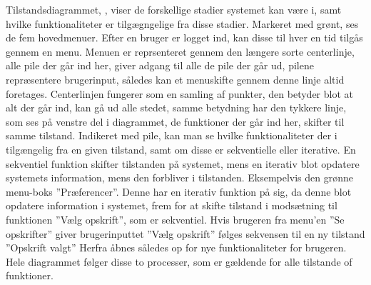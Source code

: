 Tilstandsdiagrammet, \myref{}, viser de forskellige stadier systemet kan være i, samt hvilke funktionaliteter er tilgægngelige fra disse stadier.
Markeret med grønt, ses de fem hovedmenuer. 
Efter en bruger er logget ind, kan disse til hver en tid tilgås gennem en menu.
Menuen er reprsenteret gennem den længere sorte centerlinje,  alle pile der går ind her, giver adgang til alle de pile der går ud, pilene repræsentere brugerinput, således kan et menuskifte gennem denne linje altid foretages.
Centerlinjen fungerer som en samling af punkter, den betyder blot at alt der går ind, kan gå ud alle stedet, samme betydning har den tykkere linje, som ses på venstre del i diagrammet, de funktioner der går ind her, skifter til samme tilstand.
Indikeret med pile, kan man se hvilke funktionaliteter der i tilgængelig fra en given tilstand, samt om disse er sekventielle eller iterative.
En sekventiel funktion skifter tilstanden på systemet, mens en iterativ blot opdatere systemets information, mens den forbliver i tilstanden.
Eksempelvis den grønne menu-boks ''Præferencer''.
Denne har en iterativ funktion på sig, da denne blot opdatere information i systemet, frem for at skifte tilstand i modsætning til funktionen ''Vælg opskrift'', som er sekventiel.
Hvis brugeren fra menu'en ''Se opskrifter'' giver brugerinputtet ''Vælg opskrift'' følges sekvensen til en ny tilstand ''Opskrift valgt'' Herfra åbnes således op for nye funktionaliteter for brugeren.
Hele diagrammet følger disse to processer, som er gældende for alle tilstande of funktioner.